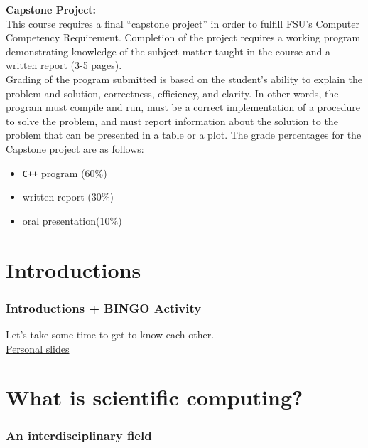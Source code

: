 \documentclass{if-beamer}
\begin{document}
\begin{frame}
\textbf{Capstone Project:} \\[0.1cm]
This course requires a final “capstone project” in order to fulfill FSU’s
Computer Competency Requirement. Completion of the
project requires a working program demonstrating knowledge of the subject matter taught in the course and a written report (3-5 pages).\\
\vspace{.25cm}
Grading of the program submitted is based on the student's ability to explain the problem and solution, correctness, efficiency, and clarity. In other words, the program must compile and run, must be a correct implementation of a procedure to solve the problem, and must report information about the solution to the problem that can be presented in a table or a plot. The grade percentages for the Capstone project are as follows:
\begin{itemize}
	\item \texttt{C++} program (60\%)
	\item written report (30\%)
	\item oral presentation(10\%)
\end{itemize}

\end{frame}

\section{Introductions}
\begin{frame}
	\frametitle{Introductions + BINGO Activity}
	Let's take some time to get to know each other. \\\vspace{0.25cm}
	\href{https://docs.google.com/presentation/d/1RA8mvQN5wGJxhHejI15yhpj0bJaxpHsFAa3dCMYQcvM/edit?usp=sharing}{Personal slides}
	
\end{frame}



\section{What is scientific computing?}
\begin{frame}
\frametitle{An interdisciplinary field}
\begin{figure}
	\center
\end{figure}
\end{frame}
\end{document}
